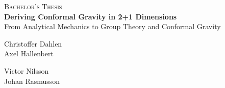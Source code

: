

\newpage
\thispagestyle{empty}
\begin{center}
	\textsc{\large Bachelor's Thesis}\\[4cm]
	\textbf{\Large Deriving Conformal Gravity in 2+1 Dimensions} \\[1cm]
	{\large From Analytical Mechanics to Group Theory and Conformal Gravity}\\[1cm]
	
\end{center}
	\begin{minipage}{0.6\textwidth}
\begin{flushleft} \large
Christoffer Dahlen\\
Axel Hallenbert
\end{flushleft}
\end{minipage}
\begin{minipage}{0.6\textwidth}
\begin{flushleft} \large
Victor Nilsson\\
Johan Rasmusson
\end{flushleft}
\end{minipage}\\[2.5cm]
	
